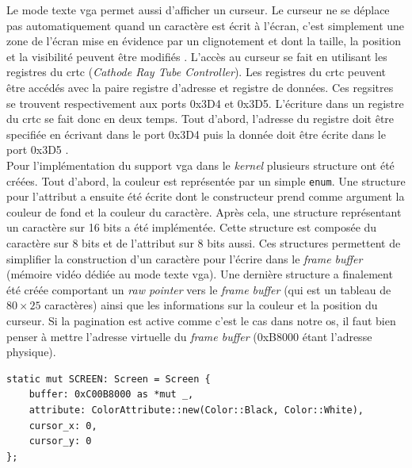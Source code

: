 Le mode texte \acrshort{vga} permet aussi d'afficher un curseur. Le curseur ne
se déplace pas automatiquement quand un caractère est écrit à l'écran, c'est
simplement une zone de l'écran mise en évidence par un clignotement et dont
la taille, la position et la visibilité peuvent être modifiés \cite{ref23}. L'accès
au curseur se fait en utilisant les registres du \acrshort{crtc} (\textit{Cathode Ray
Tube Controller}). Les registres du \acrshort{crtc} peuvent être accédés avec la
paire registre d'adresse et registre de données. Ces regsitres se trouvent respectivement
aux ports 0x3D4 et 0x3D5. L'écriture dans un registre du \acrshort{crtc} se fait
donc en deux temps. Tout d'abord, l'adresse du registre doit être specifiée
en écrivant dans le port 0x3D4 puis la donnée doit être écrite dans le port 0x3D5
\cite{ref42}. \\

Pour l'implémentation du support \acrshort{vga} dans le \textit{kernel} plusieurs
structure ont été créées. Tout d'abord, la couleur est représentée par un simple
\texttt{enum}. Une structure pour l'attribut a ensuite été écrite
dont le constructeur prend comme argument la couleur de fond et la couleur du
caractère. Après cela, une structure représentant un caractère sur 16 bits a été
implémentée. Cette structure est composée du caractère sur 8 bits et de l'attribut
sur 8 bits aussi. Ces structures permettent de simplifier la construction d'un
caractère pour l'écrire dans le \textit{frame buffer} (mémoire vidéo dédiée au
mode texte \acrshort{vga}). Une dernière structure a finalement été créée
comportant un \textit{raw pointer} vers le \textit{frame buffer} (qui est un
tableau de $80 \times 25$ caractères) ainsi que les informations sur la couleur
et la position du curseur. Si la pagination est active comme c'est le cas dans
notre \acrshort{os}, il faut bien penser à mettre l'adresse virtuelle du
\textit{frame buffer} (0xB8000 étant l'adresse physique). \\

\begin{verbatim}
static mut SCREEN: Screen = Screen {
    buffer: 0xC00B8000 as *mut _,
    attribute: ColorAttribute::new(Color::Black, Color::White),
    cursor_x: 0,
    cursor_y: 0
};
\end{verbatim}


